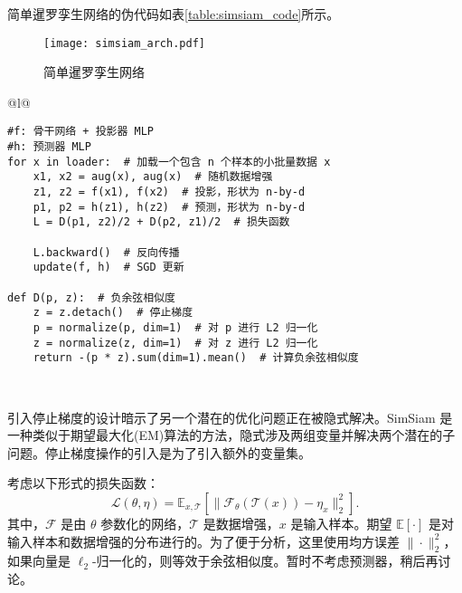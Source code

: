 \documentclass[master]{thesis-uestc}
\begin{document}
简单暹罗孪生网络的伪代码如表\ref{table:simsiam_code}所示。

\begin{figure}[h]
    \texttt{[image: simsiam\_arch.pdf]}
    \caption{简单暹罗孪生网络}
    \label{simsiam_arch}
\end{figure}

\begin{table}
    \caption{{简单暹罗孪生网络的伪代码，用Pytorch描述}}
    \begin{tabular}{@{}l@{}}
    \toprule
     \\
    \midrule
    \begin{lstlisting}[basicstyle=\fontspec{Times New Roman}, frame=none]
#f: 骨干网络 + 投影器 MLP
#h: 预测器 MLP
for x in loader:  # 加载一个包含 n 个样本的小批量数据 x
    x1, x2 = aug(x), aug(x)  # 随机数据增强
    z1, z2 = f(x1), f(x2)  # 投影，形状为 n-by-d
    p1, p2 = h(z1), h(z2)  # 预测，形状为 n-by-d
    L = D(p1, z2)/2 + D(p2, z1)/2  # 损失函数

    L.backward()  # 反向传播
    update(f, h)  # SGD 更新

def D(p, z):  # 负余弦相似度
    z = z.detach()  # 停止梯度
    p = normalize(p, dim=1)  # 对 p 进行 L2 归一化
    z = normalize(z, dim=1)  # 对 z 进行 L2 归一化
    return -(p * z).sum(dim=1).mean()  # 计算负余弦相似度
    \end{lstlisting} \\
    \bottomrule
    \end{tabular}
    \label{table:simsiam_code}
\end{table}

引入停止梯度的设计暗示了另一个潜在的优化问题正在被隐式解决。SimSiam 是一种类似于期望最大化(EM)算法的方法，隐式涉及两组变量并解决两个潜在的子问题。停止梯度操作的引入是为了引入额外的变量集。

考虑以下形式的损失函数：
\begin{equation}
\label{eq:loss}
\mathcal{L}(\theta,\eta)=\mathbb{E}_{x,\mathcal{T}}\left[\|\mathcal{F}_{\theta} (\mathcal{T}(x))-\eta_{x}\|^{2}_{2}\right].
\end{equation}
其中，$\mathcal{F}$ 是由 $\theta$ 参数化的网络，$\mathcal{T}$ 是数据增强，$x$ 是输入样本。期望 $\mathbb{E}[\cdot]$ 是对输入样本和数据增强的分布进行的。为了便于分析，这里使用均方误差 $\|\cdot\|^{2}_{2}$，如果向量是 $\ell_{2}$-归一化的，则等效于余弦相似度。暂时不考虑预测器，稍后再讨论。
\end{document}
